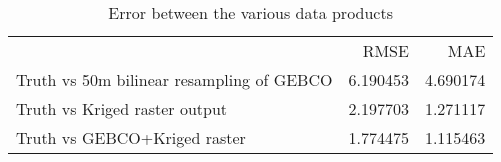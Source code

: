 \begin{table}
\caption{Error between the various data products}
\label{tab:rmse-truth-raster-sampled}
\begin{tabular}{lrr}
 & RMSE & MAE \\
Truth vs 50m bilinear resampling of GEBCO & 6.190453 & 4.690174 \\
Truth vs Kriged raster output & 2.197703 & 1.271117 \\
Truth vs GEBCO+Kriged raster & 1.774475 & 1.115463 \\
\end{tabular}
\end{table}
